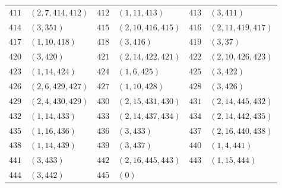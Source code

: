 {\begin{longtable}{@{}rl@{\qquad}rl@{\qquad}rl@{}}
\(411\)&\((2,7,414,412)\) & \(412\)&\((1,11,413)\) & \(413\)&\((3,411)\)\\
\(414\)&\((3,351)\) & \(415\)&\((2,10,416,415)\) & \(416\)&\((2,11,419,417)\)\\
\(417\)&\((1,10,418)\) & \(418\)&\((3,416)\) & \(419\)&\((3,37)\)\\
\(420\)&\((3,420)\) & \(421\)&\((2,14,422,421)\) & \(422\)&\((2,10,426,423)\)\\
\(423\)&\((1,14,424)\) & \(424\)&\((1,6,425)\) & \(425\)&\((3,422)\)\\
\(426\)&\((2,6,429,427)\) & \(427\)&\((1,10,428)\) & \(428\)&\((3,426)\)\\
\(429\)&\((2,4,430,429)\) & \(430\)&\((2,15,431,430)\) & \(431\)&\((2,14,445,432)\)\\
\(432\)&\((1,14,433)\) & \(433\)&\((2,14,437,434)\) & \(434\)&\((2,14,442,435)\)\\
\(435\)&\((1,16,436)\) & \(436\)&\((3,433)\) & \(437\)&\((2,16,440,438)\)\\
\(438\)&\((1,14,439)\) & \(439\)&\((3,437)\) & \(440\)&\((1,4,441)\)\\
\(441\)&\((3,433)\) & \(442\)&\((2,16,445,443)\) & \(443\)&\((1,15,444)\)\\
\(444\)&\((3,442)\) & \(445\)&\((0)\) & &\\
\end{longtable}}
